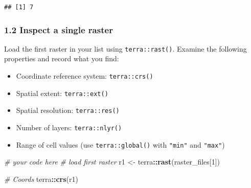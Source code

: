 \documentclass[
]{article}
\newenvironment{Shaded}{\begin{snugshade}}{\end{snugshade}}
\newcommand{\CommentTok}[1]{\textcolor[rgb]{0.56,0.35,0.01}{\textit{#1}}}
\newcommand{\DecValTok}[1]{\textcolor[rgb]{0.00,0.00,0.81}{#1}}
\newcommand{\FunctionTok}[1]{\textcolor[rgb]{0.13,0.29,0.53}{\textbf{#1}}}
\newcommand{\NormalTok}[1]{#1}
\newcommand{\OtherTok}[1]{\textcolor[rgb]{0.56,0.35,0.01}{#1}}
\newcommand{\SpecialCharTok}[1]{\textcolor[rgb]{0.81,0.36,0.00}{\textbf{#1}}}
\providecommand{\tightlist}{%
  \setlength{\itemsep}{0pt}\setlength{\parskip}{0pt}}
\begin{document}
\begin{verbatim}
## [1] 7
\end{verbatim}

\hypertarget{inspect-a-single-raster}{%
\subsubsection{1.2 Inspect a single
raster}\label{inspect-a-single-raster}}

Load the first raster in your list using \texttt{terra::rast()}. Examine
the following properties and record what you find:

\begin{itemize}
\tightlist
\item
  Coordinate reference system: \texttt{terra::crs()}
\item
  Spatial extent: \texttt{terra::ext()}
\item
  Spatial resolution: \texttt{terra::res()}
\item
  Number of layers: \texttt{terra::nlyr()}
\item
  Range of cell values (use \texttt{terra::global()} with \texttt{"min"}
  and \texttt{"max"})
\end{itemize}

\begin{Shaded}
\begin{Highlighting}[]
\CommentTok{\# your code here}
\CommentTok{\# load first raster}
\NormalTok{r1 }\OtherTok{\textless{}{-}}\NormalTok{ terra}\SpecialCharTok{::}\FunctionTok{rast}\NormalTok{(raster\_files[}\DecValTok{1}\NormalTok{])}

\CommentTok{\# Coords}
\NormalTok{terra}\SpecialCharTok{::}\FunctionTok{crs}\NormalTok{(r1)}
\end{Highlighting}
\end{Shaded}
\end{document}
